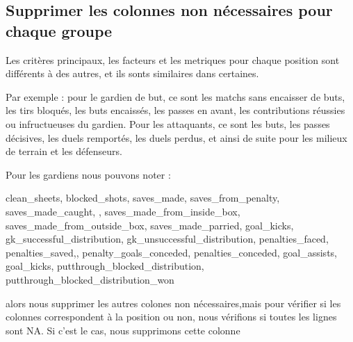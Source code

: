 \documentclass[
  6pt,
]{article}
\newenvironment{Shaded}{\begin{snugshade}}{\end{snugshade}}
\newcommand{\CommentTok}[1]{\textcolor[rgb]{0.56,0.35,0.01}{\textit{#1}}}
\newcommand{\FunctionTok}[1]{\textcolor[rgb]{0.13,0.29,0.53}{\textbf{#1}}}
\newcommand{\NormalTok}[1]{#1}
\newcommand{\OtherTok}[1]{\textcolor[rgb]{0.56,0.35,0.01}{#1}}
\newcommand{\SpecialCharTok}[1]{\textcolor[rgb]{0.81,0.36,0.00}{\textbf{#1}}}
\newcommand{\StringTok}[1]{\textcolor[rgb]{0.31,0.60,0.02}{#1}}
\begin{document}
\begin{Shaded}
\end{Shaded}

\subsection{Supprimer les colonnes non nécessaires pour chaque
groupe}\label{supprimer-les-colonnes-non-nuxe9cessaires-pour-chaque-groupe}

Les critères principaux, les facteurs et les metriques pour chaque
position sont différents à des autres, et ils sonts similaires dans
certaines.

Par exemple : pour le gardien de but, ce sont les matchs sans encaisser
de buts, les tirs bloqués, les buts encaissés, les passes en avant, les
contributions réussies ou infructueuses du gardien. Pour les attaquants,
ce sont les buts, les passes décisives, les duels remportés, les duels
perdus, et ainsi de suite pour les milieux de terrain et les défenseurs.

Pour les gardiens nous pouvons noter :

clean\_sheets, blocked\_shots, saves\_made, saves\_from\_penalty,
saves\_made\_caught, , saves\_made\_from\_inside\_box,
saves\_made\_from\_outside\_box, saves\_made\_parried, goal\_kicks,
gk\_successful\_distribution, gk\_unsuccessful\_distribution,
penalties\_faced, penalties\_saved,, penalty\_goals\_conceded,
penalties\_conceded, goal\_assists, goal\_kicks,
putthrough\_blocked\_distribution,
putthrough\_blocked\_distribution\_won

alors nous supprimer les autres colones non nécessaires,mais pour
vérifier si les colonnes correspondent à la position ou non, nous
vérifions si toutes les lignes sont NA. Si c'est le cas, nous supprimons
cette colonne
\end{document}
